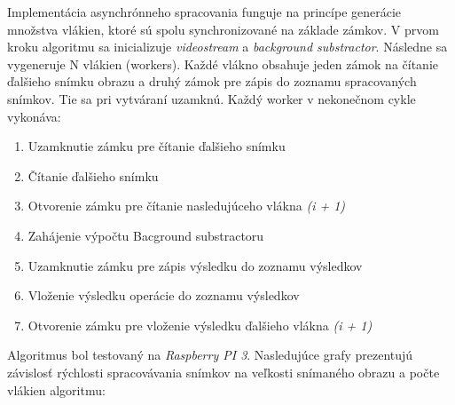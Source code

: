 Implementácia asynchrónneho spracovania funguje na princípe generácie množstva vlákien, ktoré sú spolu synchronizované na základe zámkov. V prvom kroku algoritmu sa inicializuje \textit{videostream} a \textit{background substractor}. Následne sa vygeneruje N vlákien (workers). Každé vlákno obsahuje jeden zámok na čítanie ďalšieho snímku obrazu a druhý zámok pre zápis do zoznamu spracovaných snímkov. Tie sa pri vytváraní uzamknú. Každý worker v nekonečnom cykle vykonáva:
\begin{enumerate}
\item Uzamknutie zámku pre čítanie ďalšieho snímku
\item Čítanie ďalšieho snímku 
\item Otvorenie zámku pre čítanie nasledujúceho vlákna \textit{(i + 1)}
\item Zahájenie výpočtu Bacground substractoru
\item Uzamknutie zámku pre zápis výsledku do zoznamu výsledkov
\item Vloženie výsledku operácie do zoznamu výsledkov 
\item Otvorenie zámku pre vloženie výsledku ďalšieho vlákna \textit{(i + 1)} 
\end{enumerate}

Algoritmus bol testovaný na \textit{Raspberry PI 3}. Nasledujúce grafy prezentujú závislosť rýchlosti spracovávania snímkov na veľkosti snímaného obrazu a počte vlákien algoritmu:

